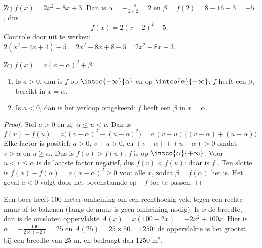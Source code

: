 \begin{example}\label{ex:g11:quad:canonical}
Zij $f(x) = 2x^2 - 8x + 3$. Dan is $\alpha = -\frac{-8}{2 \times 2} = 2$ en
$\beta = f(2) = 8 - 16 + 3 = -5$, dus
\[
f(x) = 2(x - 2)^2 - 5 .
\]
Controle door uit te werken: $2(x^2 - 4x + 4) - 5 = 2x^2 - 8x + 8 - 5 =
2x^2 - 8x + 3$.
\end{example}

\begin{proposition}\label{prop:g11:quad:variations}
Zij $f(x) = a(x-\alpha)^2 + \beta$.
\begin{enumerate}
  \item Is $a > 0$, dan is $f$  op $\intoc{-\infty}{\alpha}$ en
         op $\intco{\alpha}{+\infty}$: $f$ heeft een
        \emph{} $\beta$, bereikt in $x = \alpha$.
  \item Is $a < 0$, dan is het verloop omgekeerd: $f$ heeft een
        \emph{} $\beta$ in $x = \alpha$.
\end{enumerate}
\end{proposition}

\begin{proof}
Stel $a > 0$ en zij $\alpha \leq u < v$. Dan is
\[
f(v) - f(u) = a\bigl((v-\alpha)^2 - (u-\alpha)^2\bigr)
= a\,(v - u)\,\bigl((v-\alpha) + (u-\alpha)\bigr).
\]
Elke factor is positief: $a > 0$, $v - u > 0$, en
$(v-\alpha) + (u-\alpha) > 0$ omdat $v > \alpha$ en $u \geq \alpha$. Dus is
$f(v) > f(u)$: $f$ is  op $\intco{\alpha}{+\infty}$. Voor
$u < v \leq \alpha$ is de laatste factor negatief, dus $f(v) < f(u)$: daar
is $f$ . Ten slotte is $f(x) - f(\alpha) = a(x-\alpha)^2 \geq 0$ voor
alle $x$, zodat $\beta = f(\alpha)$ het  is. Het geval $a < 0$ volgt
door het bovenstaande op $-f$ toe te passen.
\end{proof}

\begin{example}
Een boer heeft $100$ meter omheining om een rechthoekig veld tegen een rechte
muur af te bakenen (langs de muur is geen omheining nodig). Is $x$ de
breedte, dan is de omsloten oppervlakte $A(x) = x(100 - 2x) = -2x^2 + 100x$.
Hier is $\alpha = -\frac{100}{2\times(-2)} = 25$ en
$A(25) = 25 \times 50 = 1250$: de oppervlakte is het grootst bij een breedte
van $25$ m, en bedraagt dan $1250$ m$^2$.
\end{example}

